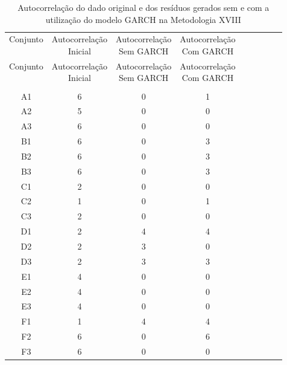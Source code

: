 \begin{center}
\begin{longtable}{ccccc|cccc}
\toprule
\rowcolor{white}
\caption[Metodologia XVIII: evolução da autocorrelação]{Autocorrelação do dado
original e dos resíduos gerados sem e com a utilização do modelo GARCH na
Metodologia XVIII} \label{tab:EvolucaoAutocorrelacaoMet18}\\
\midrule
Conjunto & \specialcell{Autocorrelação\\Inicial} & \specialcell{Autocorrelação\\Sem
GARCH} & \specialcell{Autocorrelação\\Com GARCH} \\
\midrule
\endfirsthead 
\midrule
\rowcolor{white}
Conjunto & \specialcell{Autocorrelação\\Inicial} & \specialcell{Autocorrelação\\Sem
GARCH} & \specialcell{Autocorrelação\\Com GARCH} \\
\toprule
\endhead
\midrule \\ %
\endfoot
\bottomrule 
\endlastfoot
A1    & 6     & 0     & 1 \\
A2    & 5     & 0     & 0 \\
A3    & 6     & 0     & 0 \\
B1    & 6     & 0     & 3 \\
B2    & 6     & 0     & 3 \\
B3    & 6     & 0     & 3 \\
C1    & 2     & 0     & 0 \\
C2    & 1     & 0     & 1 \\
C3    & 2     & 0     & 0 \\
D1    & 2     & 4     & 4 \\
D2    & 2     & 3     & 0 \\
D3    & 2     & 3     & 3 \\
E1    & 4     & 0     & 0 \\
E2    & 4     & 0     & 0 \\
E3    & 4     & 0     & 0 \\
F1    & 1     & 4     & 4 \\
F2    & 6     & 0     & 6 \\
F3    & 6     & 0     & 0 \\

\end{longtable}
\end{center}
